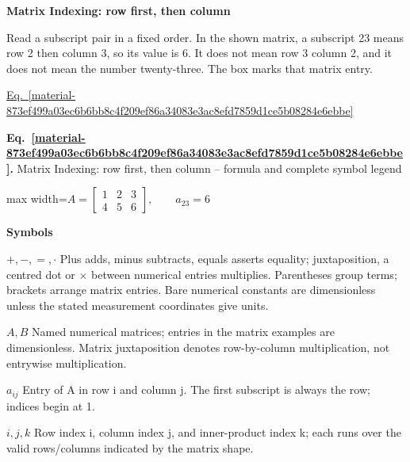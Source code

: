 \documentclass[11pt,a4paper]{article}
\begin{document}
\textbf{Matrix Indexing: row first, then column}


Read a subscript pair in a fixed order. In the shown matrix, a subscript 23 means row 2 then column 3, so its value is 6. It does not mean row 3 column 2, and it does not mean the number twenty-three. The box marks that matrix entry.


\hyperref[material-873ef499a03ec6b6bb8c4f209ef86a34083e3ac8efd7859d1ce5b08284e6ebbe]{Eq.~\ref*{material-873ef499a03ec6b6bb8c4f209ef86a34083e3ac8efd7859d1ce5b08284e6ebbe}}


\par\medskip
\noindent\begin{minipage}{\linewidth}
\label{material-873ef499a03ec6b6bb8c4f209ef86a34083e3ac8efd7859d1ce5b08284e6ebbe}
\noindent\textbf{Eq.~\ref*{material-873ef499a03ec6b6bb8c4f209ef86a34083e3ac8efd7859d1ce5b08284e6ebbe}.} Matrix Indexing: row first, then column – formula and complete symbol legend\par\nopagebreak
\begin{center}\begin{adjustbox}{max width=\linewidth}$\displaystyle A=\begin{bmatrix}1&2&3\\4&5&\boxed{6}\end{bmatrix},\qquad a_{23}=\boxed{6}$\end{adjustbox}\end{center}

\par\noindent\textbf{Symbols}

\par\noindent\textbf{\(+,-,=,\cdot\)} Plus adds, minus subtracts, equals asserts equality; juxtaposition, a centred dot or \ensuremath{\times} between numerical entries multiplies. Parentheses group terms; brackets arrange matrix entries. Bare numerical constants are dimensionless unless the stated measurement coordinates give units.

\par\noindent\textbf{\(A,B\)} Named numerical matrices; entries in the matrix examples are dimensionless. Matrix juxtaposition denotes row-by-column multiplication, not entrywise multiplication.

\par\noindent\textbf{\(a_{ij}\)} Entry of A in row i and column j. The first subscript is always the row; indices begin at 1.

\par\noindent\textbf{\(i,j,k\)} Row index i, column index j, and inner-product index k; each runs over the valid rows/columns indicated by the matrix shape.

\end{minipage}\par
\medskip
\end{document}
